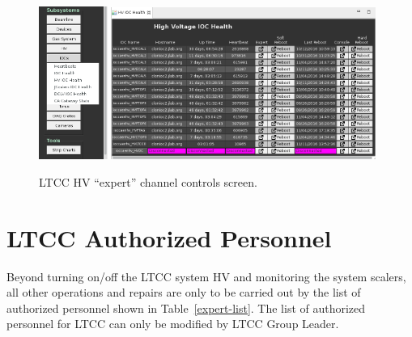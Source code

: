 \documentclass{article}
\begin{document}
\begin{figure}[ht]
  \centering
		\includegraphics[width=0.20\textwidth]{img/ioc}
		\includegraphics[width=0.77\textwidth]{img/iocHV}
		\caption{LTCC HV  “expert” channel controls screen.}
 		\label{fig:ioc}
\end{figure}

\clearpage

\section{LTCC Authorized Personnel}
\label{personnel}

Beyond turning on/off the LTCC system HV and monitoring the system scalers, all other operations and
repairs are only to be carried out by the list of authorized personnel shown in Table~\ref{expert-list}.
The list of authorized personnel for LTCC can only be modified by LTCC Group Leader.
\end{document}
